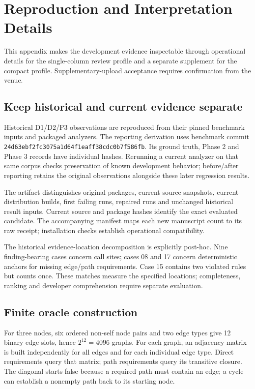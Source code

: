 \appendix
\section{Reproduction and Interpretation Details}
This appendix makes the development evidence inspectable through operational details for the single-column review profile and a separate supplement for the compact profile. Supplementary-upload acceptance requires confirmation from the venue.

\subsection{Keep historical and current evidence separate}
Historical D1/D2/P3 observations are reproduced from their pinned benchmark inputs and packaged analyzers. The reporting derivation uses benchmark commit \texttt{24d63ebf2fc3075a1d64f1eaff38cdc0b7f586fb}. Its ground truth, Phase 2 and Phase 3 records have individual hashes. Rerunning a current analyzer on that same corpus checks preservation of known development behavior; before/after reporting retains the original observations alongside these later regression results.

The artifact distinguishes original packages, current source snapshots, current distribution builds, first failing runs, repaired runs and unchanged historical result inputs. Current source and package hashes identify the exact evaluated candidate. The accompanying manifest maps each new manuscript count to its raw receipt; installation checks establish operational compatibility.

The historical evidence-location decomposition is explicitly post-hoc. Nine finding-bearing cases concern call sites; cases 08 and 17 concern deterministic anchors for missing edge/path requirements. Case 15 contains two violated rules but counts once. These matches measure the specified locations; completeness, ranking and developer comprehension require separate evaluation.

\subsection{Finite oracle construction}
For three nodes, six ordered non-self node pairs and two edge types give 12 binary edge slots, hence $2^{12}=4096$ graphs. For each graph, an adjacency matrix is built independently for all edges and for each individual edge type. Direct requirements query that matrix; path requirements query its transitive closure. The diagonal starts false because a required path must contain an edge; a cycle can establish a nonempty path back to its starting node.

